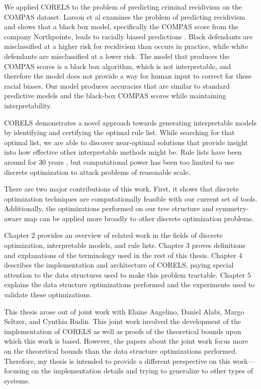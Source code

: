 We applied CORELS to the problem of predicting criminal recidivism on the COMPAS dataset.
Larson et al examines the problem of predicting recidivism and shows that a black box model, specifically the COMPAS score from the company Northpointe, leads to racially biased predictions \cite{LarsonMaKiAn16}.
Black defendants are misclassified at a higher risk for recidivism than occurs in practice, while white defendants are misclassified at a lower risk. 
The model that produces the COMPAS scores is a black box algorithm, which is not interpretable, and therefore the model does not provide a way for human input to correct for these racial biases. 
Our model produces accuracies that are similar to standard predictive models and the black-box COMPAS scores while maintaining interpretability.

CORELS demonstrates a novel approach towards generating interpretable models by identifying and certifying the optimal rule list. 
While searching for that optimal list, we are able to discover near-optimal solutions that provide insight into how effective other interpretable methods might be. 
Rule lists have been around for $30$ years \cite{Rivest87}, but computational power has been too limited to use discrete optimization to attack problems of reasonable scale.

There are two major contributions of this work.
First, it shows that discrete optimization techniques are computationally feasible with our current set of tools.
Additionally, the optimizations performed on our tree structure and symmetry-aware map can be applied more broadly to other discrete optimization problems.

Chapter $2$ provides an overview of related work in the fields of discrete optimization, interpretable models, and rule lists. 
Chapter $3$ proves definitions and explanations of the terminology used in the rest of this thesis.
Chapter $4$ describes the implementation and architecture of CORELS, paying special attention to the data structures used to make this problem tractable.
Chapter $5$ explains the data structure optimizations performed and the experiments used to validate these optimizations.

\newpage

This thesis arose out of joint work with Elaine Angelino, Daniel Alabi, Margo Seltzer, and Cynthia Rudin.
This joint work involved the development of the implementation of CORELS as well as proofs of the theoretical bounds upon which this work is based.
However, the papers about the joint work focus more on the theoretical bounds than the data structure optimizations performed.
Therefore, my thesis is intended to provide a different perspective on this work---focusing on the implementation details and trying to generalize to other types of systems.